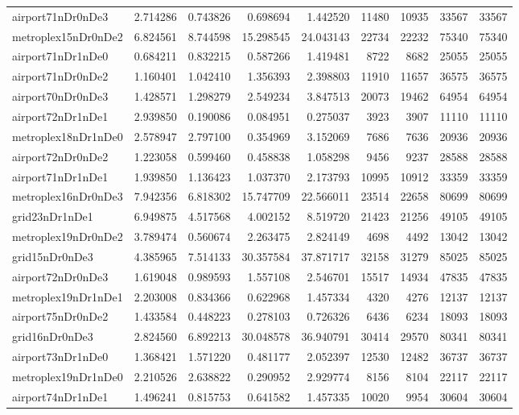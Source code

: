 \begin{longtable}{|l|r|r|r|r|r|r|r|r|}
airport71nDr0nDe3 & 2.714286 & 0.743826 & 0.698694 & 1.442520 & 11480 & 10935 & 33567 & 33567 \\
metroplex15nDr0nDe2 & 6.824561 & 8.744598 & 15.298545 & 24.043143 & 22734 & 22232 & 75340 & 75340 \\
airport71nDr1nDe0 & 0.684211 & 0.832215 & 0.587266 & 1.419481 & 8722 & 8682 & 25055 & 25055 \\
airport71nDr0nDe2 & 1.160401 & 1.042410 & 1.356393 & 2.398803 & 11910 & 11657 & 36575 & 36575 \\
airport70nDr0nDe3 & 1.428571 & 1.298279 & 2.549234 & 3.847513 & 20073 & 19462 & 64954 & 64954 \\
airport72nDr1nDe1 & 2.939850 & 0.190086 & 0.084951 & 0.275037 & 3923 & 3907 & 11110 & 11110 \\
metroplex18nDr1nDe0 & 2.578947 & 2.797100 & 0.354969 & 3.152069 & 7686 & 7636 & 20936 & 20936 \\
airport72nDr0nDe2 & 1.223058 & 0.599460 & 0.458838 & 1.058298 & 9456 & 9237 & 28588 & 28588 \\
airport71nDr1nDe1 & 1.939850 & 1.136423 & 1.037370 & 2.173793 & 10995 & 10912 & 33359 & 33359 \\
metroplex16nDr0nDe3 & 7.942356 & 6.818302 & 15.747709 & 22.566011 & 23514 & 22658 & 80699 & 80699 \\
grid23nDr1nDe1 & 6.949875 & 4.517568 & 4.002152 & 8.519720 & 21423 & 21256 & 49105 & 49105 \\
metroplex19nDr0nDe2 & 3.789474 & 0.560674 & 2.263475 & 2.824149 & 4698 & 4492 & 13042 & 13042 \\
grid15nDr0nDe3 & 4.385965 & 7.514133 & 30.357584 & 37.871717 & 32158 & 31279 & 85025 & 85025 \\
airport72nDr0nDe3 & 1.619048 & 0.989593 & 1.557108 & 2.546701 & 15517 & 14934 & 47835 & 47835 \\
metroplex19nDr1nDe1 & 2.203008 & 0.834366 & 0.622968 & 1.457334 & 4320 & 4276 & 12137 & 12137 \\
airport75nDr0nDe2 & 1.433584 & 0.448223 & 0.278103 & 0.726326 & 6436 & 6234 & 18093 & 18093 \\
grid16nDr0nDe3 & 2.824560 & 6.892213 & 30.048578 & 36.940791 & 30414 & 29570 & 80341 & 80341 \\
airport73nDr1nDe0 & 1.368421 & 1.571220 & 0.481177 & 2.052397 & 12530 & 12482 & 36737 & 36737 \\
metroplex19nDr1nDe0 & 2.210526 & 2.638822 & 0.290952 & 2.929774 & 8156 & 8104 & 22117 & 22117 \\
airport74nDr1nDe1 & 1.496241 & 0.815753 & 0.641582 & 1.457335 & 10020 & 9954 & 30604 & 30604 \\

\end{longtable}
